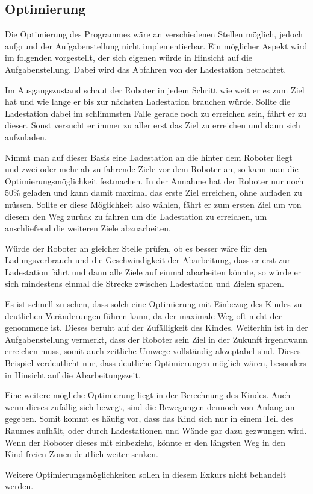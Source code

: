 \subsection{Optimierung}
Die Optimierung des Programmes wäre an verschiedenen Stellen möglich, jedoch aufgrund der Aufgabenstellung nicht implementierbar. Ein möglicher Aspekt wird im folgenden vorgestellt, der sich eigenen würde in Hinsicht auf die Aufgabenstellung. Dabei wird das Abfahren von der Ladestation betrachtet. \par
Im Ausgangszustand schaut der Roboter in jedem Schritt wie weit er es zum Ziel hat und wie lange er bis zur nächsten Ladestation brauchen würde. Sollte die Ladestation dabei im schlimmsten Falle gerade noch zu erreichen sein, fährt er zu dieser. Sonst versucht er immer zu aller erst das Ziel zu erreichen und dann sich aufzuladen. \par
Nimmt man auf dieser Basis eine Ladestation an die hinter dem Roboter liegt und zwei oder mehr ab zu fahrende Ziele vor dem Roboter an, so kann man die Optimierungsmöglichkeit festmachen. In der Annahme hat der Roboter nur noch 50\% geladen und kann damit maximal das erste Ziel erreichen, ohne aufladen zu müssen. Sollte er diese Möglichkeit also wählen, fährt er zum ersten Ziel um von diesem den Weg zurück zu fahren um die Ladestation zu erreichen, um anschließend die weiteren Ziele abzuarbeiten. \par
Würde der Roboter an gleicher Stelle prüfen, ob es besser wäre für den Ladungsverbrauch und die Geschwindigkeit der Abarbeitung, dass er erst zur Ladestation fährt und dann alle Ziele auf einmal abarbeiten könnte, so würde er sich mindestens einmal die Strecke zwischen Ladestation und Zielen sparen. \par
Es ist schnell zu sehen, dass solch eine Optimierung mit Einbezug des Kindes zu deutlichen Veränderungen führen kann, da der maximale Weg oft nicht der genommene ist. Dieses beruht auf der Zufälligkeit des Kindes. Weiterhin ist in der Aufgabenstellung vermerkt, dass der Roboter sein Ziel in der Zukunft irgendwann erreichen muss, somit auch zeitliche Umwege vollständig akzeptabel sind. Dieses Beispiel verdeutlicht nur, dass deutliche Optimierungen möglich wären, besonders in Hinsicht auf die Abarbeitungszeit. \par
Eine weitere mögliche Optimierung liegt in der Berechnung des Kindes. Auch wenn dieses zufällig sich bewegt, sind die Bewegungen dennoch von Anfang an gegeben. Somit kommt es häufig vor, dass das Kind sich nur in einem Teil des Raumes aufhält, oder durch Ladestationen und Wände gar dazu gezwungen wird. Wenn der Roboter dieses mit einbezieht, könnte er den längsten Weg in den Kind-freien Zonen deutlich weiter senken. \par
Weitere Optimierungsmöglichkeiten sollen in diesem Exkurs nicht behandelt werden.


